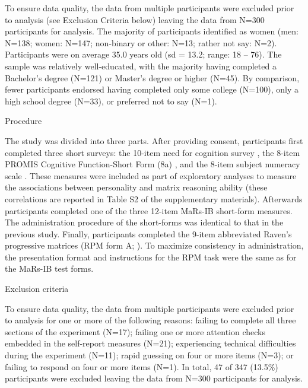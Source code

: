\documentclass[a4paper,man,natbib]{apa6}
\makeatletter
\renewcommand{\subsubsection}{\@startsection{subsubsection}{3}
  {\z@}%
  {\b@level@two@skip}{\e@level@two@skip}%
  {\normalfont\normalsize\bfseries}}
\makeatother
\begin{document}
To ensure data quality, the data from multiple participants were excluded prior to analysis (see Exclusion Criteria below) leaving the data from N=300 participants for analysis. The majority of participants identified as women (men: N=138; women: N=147; non-binary or other: N=13; rather not say: N=2). Participants were on average 35.0 years old (sd = 13.2; range: 18 -- 76). The sample was relatively well-educated, with the majority having completed a Bachelor's degree (N=121) or Master's degree or higher (N=45). By comparison, fewer participants endorsed having completed only some college (N=100), only a high school degree (N=33), or preferred not to say (N=1). 

\subsubsection{Procedure}

The study was divided into three parts. After providing consent, participants first completed three short surveys: the 10-item need for cognition survey \citep{chiesi2018applying}, the 8-item PROMIS Cognitive Function-Short Form (8a) \citep{iverson2021normative}, and the 8-item subject numeracy scale \citep{fagerlin2007measuring}. These measures were included as part of exploratory analyses to measure the associations between personality and matrix reasoning ability (these correlations are reported in Table S2 of the supplementary materials). Afterwards participants completed one of the three 12-item MaRs-IB short-form measures. The administration procedure of the short-forms was identical to that in the previous study. Finally, participants completed the 9-item abbreviated Raven's progressive matrices (RPM form A; \citealt{bilker2012development}). To maximize consistency in administration, the presentation format and instructions for the RPM task were the same as for the MaRs-IB test forms.

\subsubsection{Exclusion criteria}

To ensure data quality, the data from multiple participants were excluded prior to analysis for one or more of the following reasons: failing to complete all three sections of the experiment (N=17); failing one or more attention checks \citep{zorowitz2021inattentive} embedded in the self-report measures (N=21); experiencing technical difficulties during the experiment (N=11); rapid guessing on four or more items (N=3); or failing to respond on four or more items (N=1). In total, 47 of 347 (13.5\%) participants were excluded leaving the data from N=300 participants for analysis.
\end{document}
